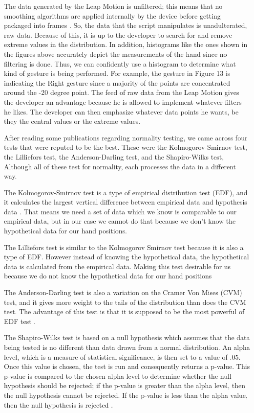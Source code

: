 \documentclass[letterpaper,english, 12pt]{article}
\begin{document}
The data generated by the Leap Motion is unfiltered; this means that no smoothing algorithms are applied internally by the device before getting packaged into frames \cite{cit11}. So, the data that the script manipulates is unadulterated, raw data. Because of this, it is up to the developer to search for and remove extreme values in the distribution. In addition, histograms like the ones shown in the figures above accurately depict the measurements of the hand since no filtering is done. Thus, we can confidently use a histogram to determine what kind of gesture is being performed. For example, the gesture in Figure 13 is indicating the Right gesture since a majority of the points are concentrated around the -20 degree point. The feed of raw data from the Leap Motion gives the developer an advantage because he is allowed to implement whatever filters he likes. The developer can then emphasize whatever data points he wants, be they the central values or the extreme values.

After reading some publications regarding normality testing, we came across four tests that were reputed to be the best. These were the Kolmogorov-Smirnov test, the Lilliefors test, the Anderson-Darling test, and the Shapiro-Wilks test, Although all of these test for normality, each processes the data in a different way.

The Kolmogorov-Smirnov test is a type of empirical distribution test (EDF), and it calculates the largest vertical difference between empirical data and hypothesis data \cite{cit8}. That means we need a set of data which we know is comparable to our empirical data, but in our case we cannot do that because we don't know the hypothetical data for our hand positions. 

The Lilliefors test is similar to the Kolmogorov Smirnov test because it is also a type of EDF. However instead of knowing the hypothetical data, the hypothetical data is calculated from the empirical data. Making this test desirable for us because we do not know the hypothetical data for our hand positions \cite{cit7}

The Anderson-Darling test is also a variation on the Cramer Von Mises (CVM) test, and it gives more weight to the tails of the distribution than does the CVM test. The advantage of this test is that it is supposed to be the most powerful of EDF test \cite{cit10}.


The Shapiro-Wilks test is based on a null hypothesis which assumes that the data being tested is no different than data drawn from a normal distribution. An alpha level, which is a measure of statistical significance, is then set to a value of .05. Once this value is chosen, the test is run and consequently returns a p-value. This p-value is compared to the chosen alpha level to determine whether the null hypothesis should be rejected; if the p-value is greater than the alpha level, then the null hypothesis cannot be rejected. If the p-value is less than the alpha value, then the null hypothesis is rejected \cite{cit2}.
\end{document}
